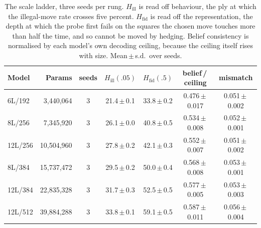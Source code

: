 \begin{table}[t]
\centering\small
\caption{The scale ladder, three seeds per rung. $H_{\mathrm{ill}}$ is read
off behaviour, the ply at which the illegal-move rate crosses five percent.
$H_{\mathrm{fid}}$ is read off the representation, the depth at which the
probe first fails on the squares the chosen move touches more than half the
time, and so cannot be moved by hedging. Belief consistency is normalised by
each model's own decoding ceiling, because the ceiling itself rises with
size. Mean\,$\pm$\,s.d.\ over seeds.}
\label{tab:scale}
\begin{tabular}{lrccccc}
\toprule
Model & Params & seeds & $H_{\mathrm{ill}}(.05)$ & $H_{\mathrm{fid}}(.5)$ & belief\,/\,ceiling & mismatch \\
\midrule
6L/192 & 3{,}440{,}064 & 3 & 21.4\,$\pm$\,0.1 & 33.8\,$\pm$\,0.2 & 0.476\,$\pm$\,0.017 & 0.051\,$\pm$\,0.002 \\
8L/256 & 7{,}345{,}920 & 3 & 26.1\,$\pm$\,0.0 & 40.8\,$\pm$\,0.5 & 0.534\,$\pm$\,0.008 & 0.052\,$\pm$\,0.001 \\
12L/256 & 10{,}504{,}960 & 3 & 27.8\,$\pm$\,0.2 & 42.1\,$\pm$\,0.3 & 0.552\,$\pm$\,0.007 & 0.051\,$\pm$\,0.002 \\
8L/384 & 15{,}737{,}472 & 3 & 29.5\,$\pm$\,0.2 & 50.0\,$\pm$\,0.4 & 0.568\,$\pm$\,0.008 & 0.053\,$\pm$\,0.001 \\
12L/384 & 22{,}835{,}328 & 3 & 31.7\,$\pm$\,0.3 & 52.5\,$\pm$\,0.5 & 0.577\,$\pm$\,0.005 & 0.053\,$\pm$\,0.003 \\
12L/512 & 39{,}884{,}288 & 3 & 33.8\,$\pm$\,0.1 & 59.1\,$\pm$\,0.5 & 0.587\,$\pm$\,0.011 & 0.056\,$\pm$\,0.004 \\
\bottomrule
\end{tabular}
\end{table}
